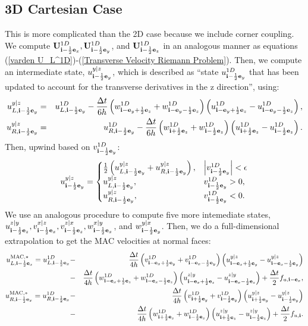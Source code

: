 \documentclass[11pt]{article}
\def\half  {\frac{1}{2}}
\def\dt    {\Delta t}
\def\mac   {\rm MAC}
\def\eb    {{\bf e}}
\def\ib    {{\bf i}}
\def\Ub    {{\bf U}}
\begin{document}
\subsection{3D Cartesian Case}
This is more complicated than the 2D case because we include corner coupling.  We compute $\Ub_{\ib-\half\eb_x}^{1D}, \Ub_{\ib-\half\eb_y}^{1D}$, and $\Ub_{\ib-\half\eb_z}^{1D}$ in an analogous manner as equations (\ref{varden U_L^1D})-(\ref{Transverse Velocity Riemann Problem}).  Then, we compute an intermediate state, $u_{\ib-\half\eb_y}^{y|z}$, which is described as ``state $u_{\ib-\half\eb_y}^{1D}$ that has been updated to account for the transverse derivatives in the z direction'', using:
\begin{eqnarray}
u_{L,\ib-\half\eb_y}^{y|z} &=& u_{L,\ib-\half\eb_y}^{1D} - \frac{\dt}{6h}\left(w_{\ib-\eb_y+\half\eb_z}^{1D}+w_{\ib-\eb_y-\half\eb_z}^{1D}\right)\left(u_{\ib-\eb_y+\half\eb_z}^{1D}-u_{\ib-\eb_y-\half\eb_z}^{1D}\right), \\
u_{R,\ib-\half\eb_y}^{y|z} &=& u_{R,\ib-\half\eb_y}^{1D} - \frac{\dt}{6h}\left(w_{\ib+\half\eb_z}^{1D}+w_{\ib-\half\eb_z}^{1D}\right)\left(u_{\ib+\half\eb_z}^{1D}-u_{\ib-\half\eb_z}^{1D}\right).
\end{eqnarray}
Then, upwind based on $v_{\ib-\half\eb_y}^{1D}$:
\begin{equation}
u_{\ib-\half\eb_y}^{y|z} =
\begin{cases}
\half\left(u_{L,\ib-\half\eb_y}^{y|z} + u_{R,\ib-\half\eb_y}^{y|z}\right), & \left|v_{\ib-\half\eb_y}^{1D}\right| < \epsilon \\
u_{L,\ib-\half\eb_y}^{y|z}, & v_{\ib-\half\eb_y}^{1D} > 0, \\
u_{R,\ib-\half\eb_y}^{y|z}, & v_{\ib-\half\eb_y}^{1D} < 0.
\end{cases}
\end{equation}
We use an analogous procedure to compute five more intemediate states, $u_{\ib-\half\eb_z}^{z|y}, v_{\ib-\half\eb_x}^{x|z}, v_{\ib-\half\eb_z}^{z|x}, w_{\ib-\half\eb_x}^{x|y}$, and $w_{\ib-\half\eb_y}^{y|x}$.  Then, we do a full-dimensional extrapolation to get the MAC velocities at normal faces:
\begin{eqnarray}
u_{L,\ib-\half\eb_x}^{\mac,*} = u_{L,\ib-\half\eb_x}^{1D} &-& \frac{\dt}{4h}\left(v_{\ib-\eb_x+\half\eb_y}^{1D}+v_{\ib-\eb_x-\half\eb_y}^{1D}\right)\left(u_{\ib-\eb_x+\half\eb_y}^{y|z}-u_{\ib-\eb_x-\half\eb_y}^{y|z}\right) \nonumber \\
&-& \frac{\dt}{4h}\left(w_{\ib-\eb_x+\half\eb_z}^{1D}+w_{\ib-\eb_x-\half\eb_z}^{1D}\right)\left(u_{\ib-\eb_x+\half\eb_z}^{z|y}-u_{\ib-\eb_x-\half\eb_z}^{z|y}\right) + \frac{\dt}{2}f_{u,\ib-\eb_x}, \\
u_{R,\ib-\half\eb_x}^{\mac,*} = u_{R,\ib-\half\eb_x}^{1D} &-& \frac{\dt}{4h}\left(v_{\ib+\half\eb_y}^{1D}+v_{\ib-\half\eb_y}^{1D}\right)\left(u_{\ib+\half\eb_y}^{y|z}-u_{\ib-\half\eb_y}^{y|z}\right) \nonumber \\
&-& \frac{\dt}{4h}\left(w_{\ib+\half\eb_z}^{1D}+w_{\ib-\half\eb_z}^{1D}\right)\left(u_{\ib+\half\eb_z}^{z|y}-u_{\ib-\half\eb_z}^{z|y}\right) + \frac{\dt}{2}f_{u,\ib}.
\end{eqnarray}
\end{document}
